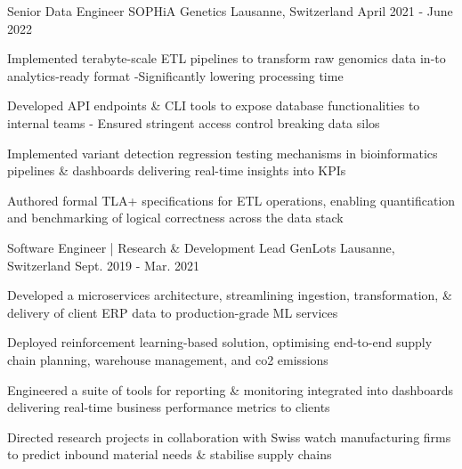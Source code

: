 \begin{cventries}
 \cventry
    {Senior Data Engineer} %
    {SOPHiA Genetics} %
    {Lausanne, Switzerland} %
    {April 2021 - June 2022} %
    {
      \begin{cvitems} %
        \item {Implemented terabyte-scale ETL pipelines to transform raw genomics data in-to analytics-ready format -Significantly lowering processing time}
        \item {Developed API endpoints \& CLI tools to expose database functionalities to internal teams - Ensured stringent access control breaking data silos}
        \item {Implemented variant detection regression testing mechanisms in bioinformatics pipelines \& dashboards delivering real-time insights into KPIs}
        \item {Authored formal TLA+ specifications for ETL operations, enabling quantification and benchmarking of logical correctness across the data stack}
      \end{cvitems}
    }
    
    \vspace{-0.1cm}

  \cventry
    {Software Engineer | Research \& Development Lead} %
    {GenLots} %
    {Lausanne, Switzerland} %
    {Sept. 2019 - Mar. 2021} %
    {
      \begin{cvitems} %
        \item {Developed a microservices architecture, streamlining ingestion, transformation, \& delivery of client ERP data to production-grade ML services}
      	\item {Deployed reinforcement learning-based solution, optimising end-to-end supply chain planning, warehouse management, and co2 emissions}
        \item {Engineered a suite of tools for reporting \& monitoring integrated into dashboards delivering real-time business performance metrics to clients}
        \item {Directed research projects in collaboration with Swiss watch manufacturing firms to predict inbound material needs \& stabilise supply chains}
      \end{cvitems}
    } 
   
   \vspace{-0.1cm}


\end{cventries}
